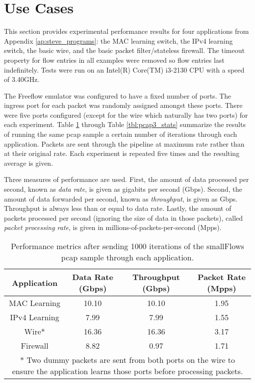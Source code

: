 \section{Use Cases}

This section provides experimental performance results for four applications from Appendix \ref{ap:steve_programs}: the MAC learning switch, the IPv4 learning switch, the basic wire, and the basic packet filter/stateless firewall. The timeout property for flow entries in all examples were removed so flow entries last indefinitely. Tests were run on an Intel(R) Core(TM) i3-2130 CPU with a speed of 3.40GHz.

The Freeflow emulator was configured to have a fixed number of ports. The ingress port for each packet was randomly assigned amongst these ports. There were five ports configured (except for the wire which naturally has two ports) for each experiment. Table \ref{tbl:pcap1_stats} through Table \ref{tbl:pcap3_stats} summarize the results of running the same pcap sample a certain number of iterations through each application. Packets are sent through the pipeline at maximum rate rather than at their original rate. Each experiment is repeated five times and the resulting average is given.

Three measures of performance are used. First, the amount of data processed per second, known as \textit{data rate}, is given as gigabits per second (Gbps). Second, the amount of data forwarded per second, known as \textit{throughput}, is given as Gbps. Throughput is always less than or equal to data rate. Lastly, the amount of packets processed per second (ignoring the size of data in those packets), called \textit{packet processing rate}, is given in millions-of-packets-per-second (Mpps).

\begin{table}
\caption{Performance metrics after sending 1000 iterations of the smallFlows pcap sample through each application.}
\begin{center}
\begin{tabularx}{0.9\textwidth}{| c || c | c | c |}
\hline
Application & Data Rate (Gbps) & Throughput (Gbps) & Packet Rate (Mpps)  \\
\hline
MAC Learning & 10.10 & 10.10 & 1.95  \\
\hline
IPv4 Learning & 7.99 & 7.99 & 1.55  \\
\hline 
Wire* & 16.36 & 16.36 & 3.17 \\
\hline
Firewall & 8.82 & 0.97 & 1.71 \\
\hline
\multicolumn{4}{p{0.9\textwidth}}{* Two dummy packets are sent from both ports on the wire to ensure the application learns those ports before processing packets.}
\end{tabularx}
\end{center}
\label{tbl:pcap1_stats}
\end{table}


